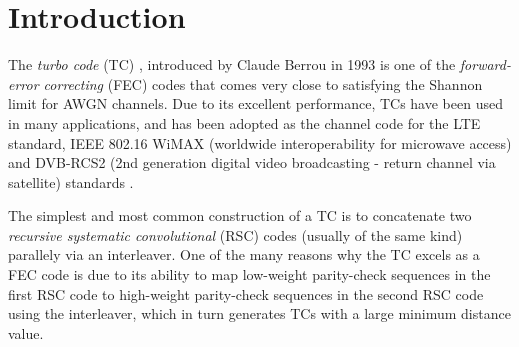 \section{Introduction}

The {\it turbo code} (TC) \cite{ref1}, introduced by Claude Berrou in 1993 is one of the \textit{forward-error correcting} (FEC) codes that comes very close to satisfying the Shannon limit for AWGN channels.  Due to its excellent performance, TCs have been used in many applications,  and  has been adopted as the channel code for the LTE standard, IEEE 802.16 WiMAX (worldwide interoperability for microwave access) and DVB-RCS2 (2nd generation digital video broadcasting - return channel via satellite) standards \cite{ref7}.

 The simplest and most common construction of a TC is  to concatenate  two {\it recursive systematic convolutional} (RSC) codes (usually of the same kind) parallely  via an interleaver. One of the many reasons why the TC excels as a FEC code is due to its ability to map low-weight parity-check sequences in the first RSC code to high-weight parity-check sequences in the second RSC code using the interleaver, which in turn generates TCs with a large minimum distance value.


